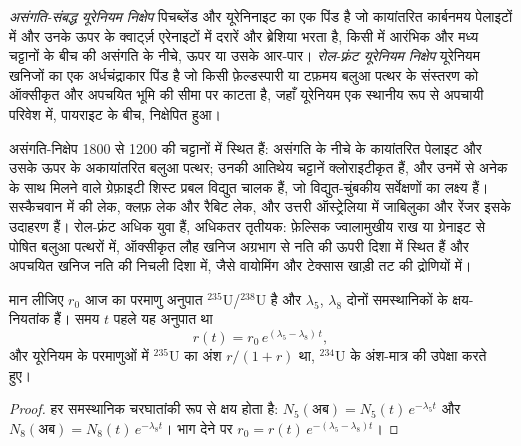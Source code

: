\begin{definition}[असंगति-संबद्ध और रोल-फ़्रंट यूरेनियम निक्षेप]\label{def:b2:energy-geology:uranium}
\emph{असंगति-संबद्ध यूरेनियम निक्षेप} पिचब्लेंड और यूरेनिनाइट का
एक पिंड है जो कायांतरित कार्बनमय पेलाइटों में और उनके ऊपर के क्वार्ट्ज़ एरेनाइटों में दरारें और ब्रेशिया भरता है,
किसी  में आरंभिक और मध्य  चट्टानों के बीच की असंगति के नीचे, ऊपर या उसके
आर-पार। \emph{रोल-फ़्रंट यूरेनियम निक्षेप}
यूरेनियम खनिजों का एक अर्धचंद्राकार पिंड है जो किसी फ़ेल्डस्पारी या टफ़मय बलुआ पत्थर के संस्तरण को
ऑक्सीकृत और अपचयित भूमि की सीमा पर काटता है, जहाँ यूरेनियम एक स्थानीय रूप से अपचायी परिवेश में,
पायराइट के बीच, निक्षेपित हुआ।
\end{definition}

असंगति-निक्षेप 1800 से \qty{1200}{\Ma} की चट्टानों में स्थित हैं: असंगति के नीचे के कायांतरित
पेलाइट और उसके ऊपर के अकायांतरित बलुआ पत्थर; उनकी आतिथेय चट्टानें क्लोराइटीकृत हैं, और उनमें से अनेक के साथ मिलने वाले
ग्रेफ़ाइटी शिस्ट प्रबल विद्युत चालक हैं, जो विद्युत-चुंबकीय सर्वेक्षणों का लक्ष्य हैं। सस्कैचवान में की
लेक, क्लफ़ लेक और रैबिट लेक, और उत्तरी ऑस्ट्रेलिया में जाबिलुका और रेंजर इसके उदाहरण हैं। रोल-फ़्रंट अधिक युवा
हैं, अधिकतर तृतीयक: फ़ेल्सिक ज्वालामुखीय राख या ग्रेनाइट से पोषित बलुआ पत्थरों में, ऑक्सीकृत लौह खनिज
अग्रभाग से नति की ऊपरी दिशा में स्थित हैं और अपचयित खनिज नति की निचली दिशा में, जैसे वायोमिंग और टेक्सास
खाड़ी तट की द्रोणियों में।

\begin{proposition}[अतीत में यूरेनियम-235]\label{prop:b2:energy-geology:u235}
मान लीजिए $r_0$ आज का परमाणु अनुपात $^{235}$U/$^{238}$U है और $\lambda_5$, $\lambda_8$ दोनों
समस्थानिकों के क्षय-नियतांक हैं। समय $t$ पहले यह अनुपात था
\begin{equation}
r(t) = r_0\,e^{(\lambda_5 - \lambda_8)\,t} ,
\label{eq:b2:energy-geology:u235}
\end{equation}
और यूरेनियम के परमाणुओं में $^{235}$U का अंश $r/(1 + r)$ था, $^{234}$U के अंश-मात्र की
उपेक्षा करते हुए।
\end{proposition}

\begin{proof}
हर समस्थानिक चरघातांकी रूप से क्षय होता है: $N_5(\text{अब}) = N_5(t)\,e^{-\lambda_5 t}$ और $N_8(\text{अब})
= N_8(t)\,e^{-\lambda_8 t}$। भाग देने पर $r_0 = r(t)\,e^{-(\lambda_5 - \lambda_8)t}$।
\end{proof}


